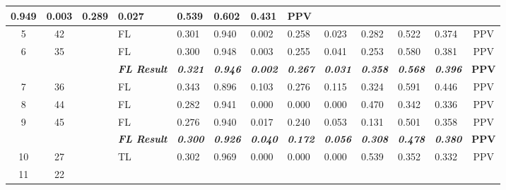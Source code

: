 \begin{table}[H]
{\begin{tabular}{ccc|l|l|l|l|l|l|l|l|l|c|}
    0.949 &
    0.003 &
    0.289 &
    0.027 &
    0.539 &
    0.602 &
    0.431 &
    PPV \\ \hline
  \multicolumn{1}{|c|}{5} &
    \multicolumn{1}{c|}{42} &
    \cellcolor[HTML]{6638B6}{\color[HTML]{FFFFFF} DB} &
    FL &
    0.301 &
    0.940 &
    0.002 &
    0.258 &
    0.023 &
    0.282 &
    0.522 &
    0.374 &
    PPV \\ \hline
  \multicolumn{1}{|c|}{6} &
    \multicolumn{1}{c|}{35} &
    \cellcolor[HTML]{6638B6}{\color[HTML]{FFFFFF} DB} &
    FL &
    0.300 &
    0.948 &
    0.003 &
    0.255 &
    0.041 &
    0.253 &
    0.580 &
    0.381 &
    PPV \\ \hline
   &
     &
     &
    \textit{\textbf{FL Result}} &
    \textit{\textbf{0.321}} &
    \textit{\textbf{0.946}} &
    \textit{\textbf{0.002}} &
    \textit{\textbf{0.267}} &
    \textit{\textbf{0.031}} &
    \textit{\textbf{0.358}} &
    \textit{\textbf{0.568}} &
    \textit{\textbf{0.396}} &
    \textbf{PPV} \\ \hline
  \multicolumn{1}{|c|}{7} &
    \multicolumn{1}{c|}{36} &
    \cellcolor[HTML]{00A9CE}{\color[HTML]{FFFFFF} RB} &
    FL &
    0.343 &
    0.896 &
    0.103 &
    0.276 &
    0.115 &
    0.324 &
    0.591 &
    0.446 &
    PPV \\ \hline
  \multicolumn{1}{|c|}{8} &
    \multicolumn{1}{c|}{44} &
    \cellcolor[HTML]{00A9CE}{\color[HTML]{FFFFFF} RB} &
    FL &
    0.282 &
    0.941 &
    0.000 &
    0.000 &
    0.000 &
    0.470 &
    0.342 &
    0.336 &
    PPV \\ \hline
  \multicolumn{1}{|c|}{9} &
    \multicolumn{1}{c|}{45} &
    \cellcolor[HTML]{00A9CE}{\color[HTML]{FFFFFF} RB} &
    FL &
    0.276 &
    0.940 &
    0.017 &
    0.240 &
    0.053 &
    0.131 &
    0.501 &
    0.358 &
    PPV \\ \hline
   &
     &
    {\color[HTML]{FFFFFF} } &
    \textit{\textbf{FL Result}} &
    \textit{\textbf{0.300}} &
    \textit{\textbf{0.926}} &
    \textit{\textbf{0.040}} &
    \textit{\textbf{0.172}} &
    \textit{\textbf{0.056}} &
    \textit{\textbf{0.308}} &
    \textit{\textbf{0.478}} &
    \textit{\textbf{0.380}} &
    \textbf{PPV} \\ \hline
  \multicolumn{1}{|c|}{10} &
    \multicolumn{1}{c|}{27} &
    \cellcolor[HTML]{00A9CE}{\color[HTML]{FFFFFF} RB} &
    TL &
    0.302 &
    0.969 &
    0.000 &
    0.000 &
    0.000 &
    0.539 &
    0.352 &
    0.332 &
    PPV \\ \hline
  \multicolumn{1}{|c|}{11} &
    \multicolumn{1}{c|}{22} &

\end{tabular}}
\end{table}

